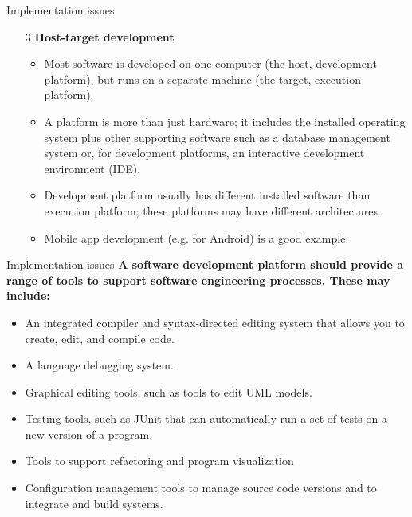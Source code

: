 \documentclass{beamer}
\begin{document}
\begin{frame}{Implementation issues}
\begin{itemize}
	\item[3] \textbf{Host-target development}
	\begin{itemize}
		\item Most software is developed on one computer (the host, development platform), but runs on a separate machine (the target, execution platform). 
		\item A platform is more than just hardware; it includes the installed operating system plus other supporting software such as a database management system or, for development platforms, an interactive development environment (IDE). 
		\item Development platform usually has different installed software than execution platform; these platforms may have different architectures. 
		\item Mobile app development (e.g. for Android) is a good example.
		
	\end{itemize} 
\end{itemize}
\end{frame}
\begin{frame}{Implementation issues}
	\textbf{A software development platform should provide a range of tools to 
		support software engineering processes. These may include:}
	\begin{itemize}
		\item An integrated compiler and syntax-directed editing system that allows you to 
		create, edit, and compile code.
		\item A language debugging system.
		\item Graphical editing tools, such as tools to edit UML models.
		\item Testing tools, such as JUnit that can automatically run a set of tests on a new version of a program.
		\item Tools to support refactoring and program visualization
		\item Configuration management tools to manage source code versions and to integrate 
		and build systems.
		
	\end{itemize}
\end{frame}
\end{document}

